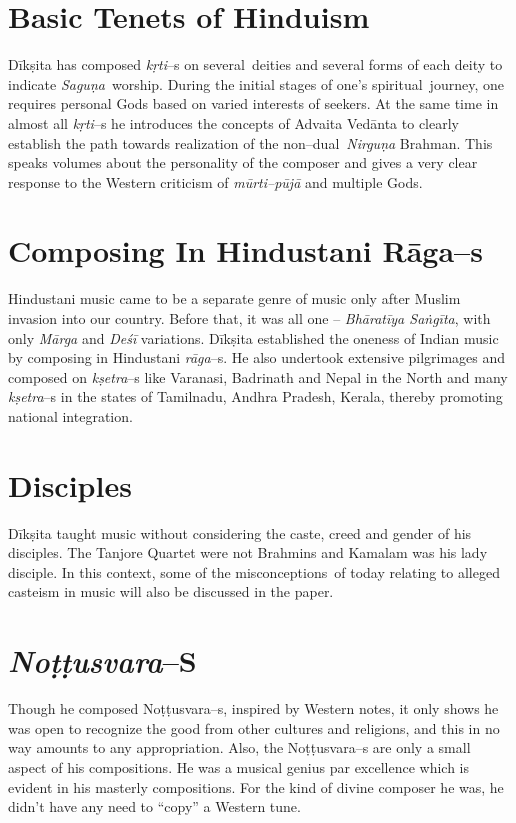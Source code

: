 \section*{Basic Tenets of Hinduism}

Dīkṣita has composed \textit{kṛti}–s on several deities and several forms of each deity to indicate \textit{Saguṇa} worship. During the initial stages of one’s spiritual journey, one requires personal Gods based on varied interests of seekers. At the same time in almost all \textit{kṛti}–s he introduces the concepts of Advaita Vedānta to clearly establish the path towards realization of the non–dual \textit{Nirguṇa} Brahman. This speaks volumes about the personality of the composer and gives a very clear response to the Western criticism of \textit{mūrti–pūjā} and multiple Gods.


\section*{Composing In Hindustani Rāga–s}

Hindustani music came to be a separate genre of music only after Muslim invasion into our country. Before that, it was all one – \textit{Bhāratīya Saṅgīta}, with only \textit{Mārga} and \textit{Deśī} variations. Dīkṣita established the oneness of Indian music by composing in Hindustani \textit{rāga}–s. He also undertook extensive pilgrimages and composed on \textit{kṣetra}–s like Varanasi, Badrinath and Nepal in the North and many \textit{kṣetra}–s in the states of Tamilnadu, Andhra Pradesh, Kerala, thereby promoting national integration.


\section*{Disciples}

Dīkṣita taught music without considering the caste, creed and gender of his disciples. The Tanjore Quartet were not Brahmins and Kamalam was his lady disciple. In this context, some of the misconceptions of today relating to alleged casteism in music will also be discussed in the paper.


\section*{\textit{Noṭṭusvara}–S}

Though he composed Noṭṭusvara–s, inspired by Western notes, it only shows he was open to recognize the good from other cultures and religions, and this in no way amounts to any appropriation. Also, the Noṭṭusvara–s are only a small aspect of his compositions. He was a musical genius par excellence which is evident in his masterly compositions. For the kind of divine composer he was, he didn’t have any need to “copy” a Western tune.


